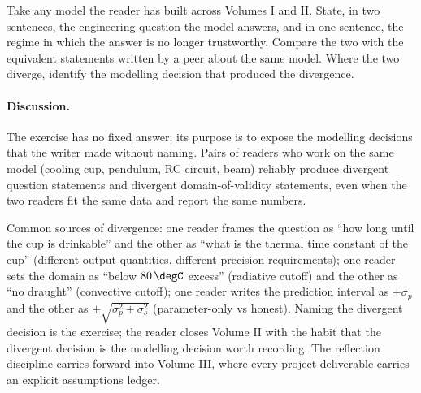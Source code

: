\begin{exercise}
Take any model the reader has built across Volumes I and II.
State, in two sentences, the engineering question the model
answers, and in one sentence, the regime in which the answer
is no longer trustworthy. Compare the two with the equivalent
statements written by a peer about the same model. Where the
two diverge, identify the modelling decision that produced
the divergence.

\paragraph{Discussion.} The exercise has no fixed answer; its
purpose is to expose the modelling decisions that the writer made
without naming. Pairs of readers who work on the same model
(cooling cup, pendulum, RC circuit, beam) reliably produce
divergent question statements and divergent domain-of-validity
statements, even when the two readers fit the same data and
report the same numbers.

Common sources of divergence: one reader frames the question as
``how long until the cup is drinkable'' and the other as ``what
is the thermal time constant of the cup'' (different output
quantities, different precision requirements); one reader sets the
domain as ``below $80\,\degC$ excess'' (radiative cutoff) and the
other as ``no draught'' (convective cutoff); one reader writes the
prediction interval as $\pm \sigma_{p}$ and the other as
$\pm \sqrt{\sigma_{p}^{2} + \sigma_{s}^{2}}$ (parameter-only vs
honest). Naming the divergent decision is the exercise; the
reader closes Volume II with the habit that the divergent decision
is the modelling decision worth recording. The reflection
discipline carries forward into Volume III, where every project
deliverable carries an explicit assumptions ledger.
\end{exercise}
